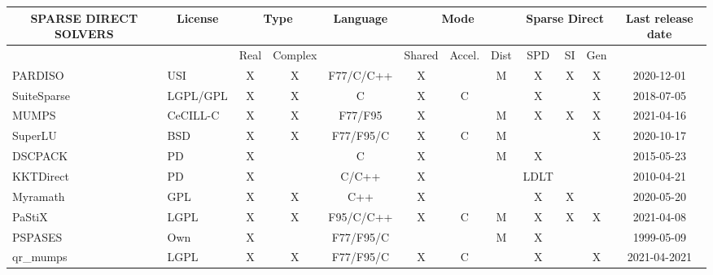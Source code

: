 \begin{table}[]
   \centering
   \begin{adjustbox}{angle=90}
\begin{tabular}{|l|l|c|c|c|c|c|c|c|c|c|c|}
\hline
   \multicolumn{1}{|c|}{SPARSE DIRECT SOLVERS} & \multicolumn{1}{c|}{License}  & \multicolumn{2}{c|}{Type} & Language  & \multicolumn{3}{c|}{Mode} & \multicolumn{3}{c|}{Sparse Direct} & Last release date \\ \hline
                      &          & Real       & Complex      &           & Shared  & Accel.  & Dist  & SPD         & SI       & Gen       &                   \\ \hline
PARDISO               & USI      & X          & X            & F77/C/C++ & X       &         & M     & X           & X        & X         & 2020-12-01        \\ \hline
SuiteSparse           & LGPL/GPL & X          & X            & C         & X       & C       &       & X           &          & X         & 2018-07-05        \\ \hline
MUMPS                 & CeCILL-C & X          & X            & F77/F95   & X       &         & M     & X           & X        & X         & 2021-04-16        \\ \hline
SuperLU               & BSD      & X          & X            & F77/F95/C & X       & C       & M     &             &          & X         & 2020-10-17        \\ \hline \hline
DSCPACK               & PD       & X          &              & C         & X       &         & M     & X           &          &           & 2015-05-23        \\ \hline
KKTDirect             & PD       & X          &              & C/C++     & X       &         &       & LDLT        &          &           & 2010-04-21        \\ \hline
Myramath              & GPL      & X          & X            & C++       & X       &         &       & X           & X        &           & 2020-05-20        \\ \hline
PaStiX                & LGPL     & X          & X            & F95/C/C++ & X       & C       & M     & X           & X        & X         & 2021-04-08        \\ \hline
PSPASES               & Own      & X          &              & F77/F95/C &         &         & M     & X           &          &           & 1999-05-09        \\ \hline
qr\_mumps             & LGPL     & X          & X            & F77/F95/C & X       & C       &       & X           &          & X         & 2021-04-2021      \\ \hline

\end{tabular}
\end{adjustbox}
\end{table}
